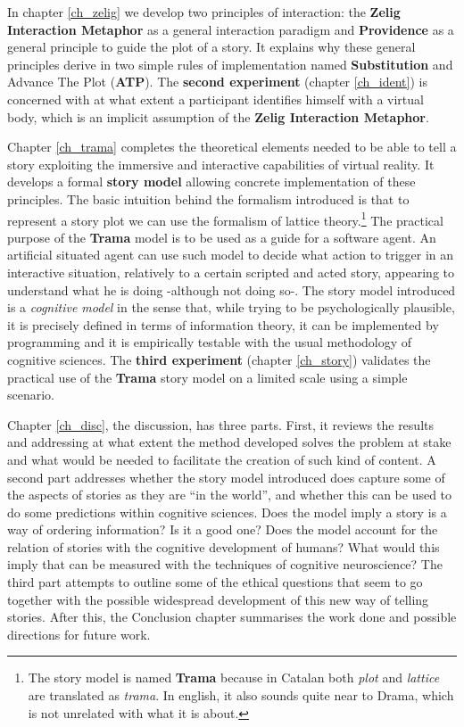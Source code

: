 \documentclass[
		twoside,openright,titlepage,numbers=noenddot,manychapters,
		headinclude,%
                footinclude=false,cleardoublepage=empty,
                BCOR=5mm,
		fontsize=11pt, %
                 enabledeprecatedfontcommands]{scrreprt}
\begin{document}
In chapter \ref{ch_zelig}  we develop two principles of interaction: the \textbf{Zelig Interaction Metaphor} as a general interaction paradigm and \textbf{Providence} as a general principle to guide the plot of a story. It explains why these general principles derive in two simple rules of implementation named \textbf{Substitution} and Advance The Plot (\textbf{ATP}). The \textbf{second experiment} (chapter \ref{ch_ident}) is concerned with at what extent a participant identifies himself with a virtual body, which is an implicit assumption of the \textbf{Zelig Interaction Metaphor}. 
 

Chapter \ref{ch_trama} completes the theoretical elements needed to be able to tell a story exploiting the immersive and interactive capabilities of virtual reality. It develops a formal \textbf{story model} allowing concrete implementation of these principles. The basic intuition behind the formalism introduced is that to represent a story plot we can use the formalism of lattice theory.\footnote{The story model is named \textbf{Trama} because in Catalan both \emph{plot} and \emph{lattice} are translated as \emph{trama}.  In english, it also sounds quite near to Drama, which is not unrelated with what it is about. } The practical purpose of the \textbf{Trama} model is to be used as a guide for a software agent. An artificial situated agent can use such model to decide what action to trigger in an interactive situation, relatively to a certain scripted and acted story, appearing to understand what he is doing -although not doing so-. The story model introduced is a \emph{cognitive model} in the sense that, while trying to be psychologically plausible, it is precisely defined in terms of information theory, it can be implemented by programming and it is empirically testable with the usual methodology of cognitive sciences. The \textbf{third experiment} (chapter \ref{ch_story}) validates the practical use of the \textbf{Trama} story model  on a limited scale using a simple scenario. 

Chapter \ref{ch_disc}, the discussion, has three parts. First, it reviews the results and addressing at what extent the method developed solves the problem at stake and what would be needed to facilitate the creation of such kind of content. A second part addresses whether the story model introduced does capture some of the aspects of stories as they are ``in the world'', and whether this can be used to do some predictions within cognitive sciences. Does the model imply a story is a way of ordering information? Is it a good one? Does the model account for the relation of stories with the cognitive development of humans?  What would this imply that can be measured with the techniques of cognitive neuroscience? The third part attempts to outline some of the ethical questions that seem to go together with the possible widespread development of this new way of telling  stories. After this, the Conclusion chapter summarises the work done and possible directions for future work.
\end{document}
